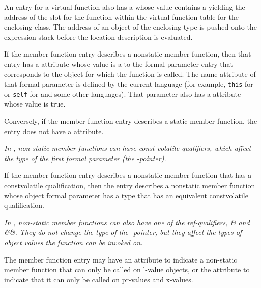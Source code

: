 An 
\hypertarget{chap:DWATvtableelemlocationvirtualfunctiontablevtableslot}{}
entry for a virtual function also has a
\DWATvtableelemlocation{}
 whose value contains
a  
yielding the address of the slot
for the function within the virtual function table for the
enclosing class. The address of an object of the enclosing
type is pushed onto the expression stack before the location
description is evaluated.

If 
\hypertarget{chap:DWATobjectpointerobjectthisselfpointerofmemberfunction}{}
the member function entry describes a non\dash static member
function, then that entry 
has 
a \DWATobjectpointer{} 
attribute
whose value is a  
to the formal parameter entry
that corresponds to the object for which the function is
called. The name attribute of that formal parameter is defined
by the current language (for example, 
\texttt{this} for  or \texttt{self}
for  
and some other languages). That parameter
also has a \DWATartificial{} attribute whose value is true.

Conversely, if the member function entry describes a static
member function, the entry does not have 
a 
\DWATobjectpointer{}
attribute.

\textit{In , non-static member functions can have const-volatile
qualifiers, which affect the type of the first formal parameter (the
-pointer).}
 
If the member function entry describes a non\dash static member
function that has a const\dash volatile qualification, then
the entry describes a non\dash static member function whose
object formal parameter has a type that has an equivalent
const\dash volatile qualification.

\textit{In , non-static member functions can also have one of the
ref-qualifiers, \& and \&\&. They do not change the type of the
-pointer, but they affect the types of object values the
function can be invoked on.}

The member function entry may have an \DWATreferenceNAME{} attribute
to indicate a non-static member function that can only be called on
l-value objects, or the \DWATrvaluereferenceNAME{} attribute 
to indicate that it can only be called on pr-values and x-values.

